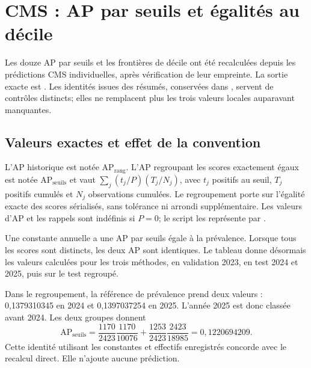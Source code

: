 \par{}
\section{CMS : AP par seuils et égalités au décile}
\label{supp:ties}
Les douze AP par seuils et les frontières de décile ont été recalculées depuis les prédictions CMS individuelles, après vérification de leur empreinte. La sortie exacte est . Les identités issues des résumés, conservées dans , servent de contrôles distincts; elles ne remplacent plus les trois valeurs locales auparavant manquantes.

\subsection{Valeurs exactes et effet de la convention}
L'AP historique est notée $\mathrm{AP}_{\mathrm{rang}}$. L'AP regroupant les scores exactement égaux est notée $\mathrm{AP}_{\mathrm{seuils}}$ et vaut $\sum_j(t_j/P)(T_j/N_j)$, avec $t_j$ positifs au seuil, $T_j$ positifs cumulés et $N_j$ observations cumulées\cite{sklearnap}. Le regroupement porte sur l'égalité exacte des scores sérialisés, sans tolérance ni arrondi supplémentaire. Les valeurs d'AP et les rappels sont indéfinis si $P=0$; le script les représente par .

Une constante annuelle a une AP par seuils égale à la prévalence. Lorsque tous les scores sont distincts, les deux AP sont identiques. Le tableau donne désormais les valeurs calculées pour les trois méthodes, en validation 2023, en test 2024 et 2025, puis sur le test regroupé.

\begin{table}[!htbp]\centering\small
\caption{AP calculées sur les prédictions individuelles gelées. Les neuf décimales distinguent la précision numérique de l'incertitude statistique; aucun nouvel intervalle n'est associé à l'AP par seuils.}

\end{table}

Dans le regroupement, la référence de prévalence prend deux valeurs : 0,1379310345 en 2024 et 0,1397037254 en 2025. L'année 2025 est donc classée avant 2024. Les deux groupes donnent
\[
\mathrm{AP}_{\mathrm{seuils}}=
\frac{1170}{2423}\frac{1170}{10076}
+\frac{1253}{2423}\frac{2423}{18985}=0,1220694209.
\]
Cette identité utilisant les constantes et effectifs enregistrés concorde avec le recalcul direct. Elle n'ajoute aucune prédiction.

